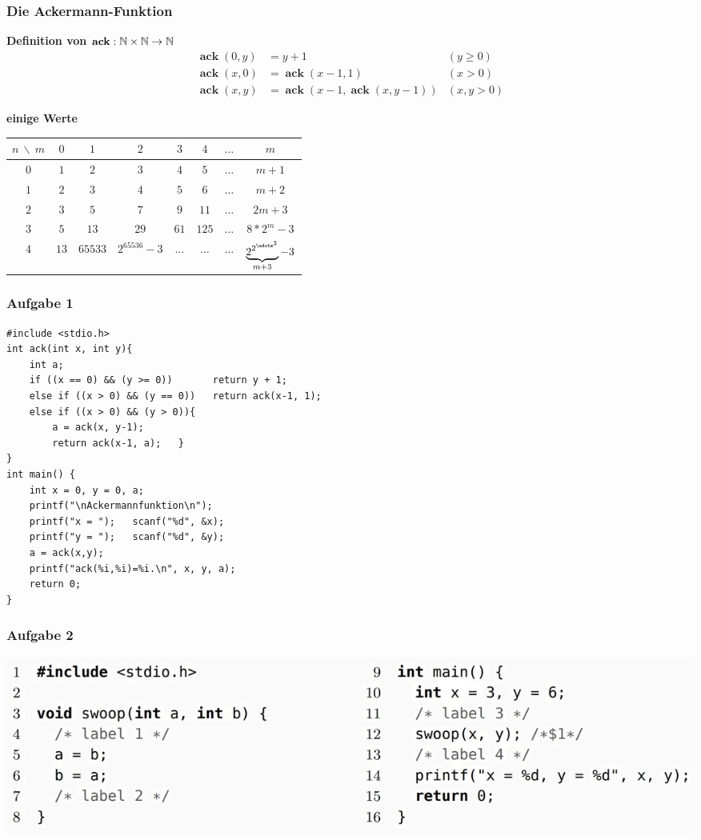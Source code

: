 \documentclass{beamer}
\DeclareMathOperator{\ack}{\mathbf{ack}}
\begin{document}
\begin{frame} \frametitle{Die Ackermann-Funktion}
\textbf{Definition von  $\ack : \N \times \N \to \N$}
	\begin{align*}
	\ack(0,y) &= y + 1 &(y \ge 0) \\
	\ack(x,0) &= \ack(x-1,1) &(x > 0)\\
	\ack(x,y) &= \ack(x-1,\ack(x,y-1)) &(x,y > 0)
	\end{align*}
	
	\textbf{einige Werte}
	
	\begin{small}
		\begin{tabular}{c||ccccccc}
			$n \ \backslash \ m$ & $0$ & $1$ & $2$ & $3$ & $4$ & $\dots$ & $m$ \\ \hline\hline
			$0$ & $1$ & $2$ & $3$ & $4$ & $5$ & $\dots$ & $m+1$ \\
			$1$ & $2$ & $3$ & $4$ & $5$ & $6$ & $\dots$ & $m+2$ \\
			$2$ & $3$ & $5$ & $7$ & $9$ & $11$ & $\dots$ & $2m+3$ \\
			$3$ & $5$ & $13$ & $29$ & $61$ & $125$ & $\dots$ & $8*2^m-3$ \\
			$4$ & $13$ & $65533$ & $2^{65536} -3$ & $\dots$ & $\dots$ & $\dots$ & $\underbrace{2^{2^{{\udots}^2}} }_{m+3}- 3$ 
		\end{tabular}
	\end{small}	
\end{frame}

\begin{frame}[fragile] \frametitle{Aufgabe 1}
	\footnotesize
\begin{lstlisting}
#include <stdio.h>
int ack(int x, int y){
	int a;
	if ((x == 0) && (y >= 0))       return y + 1;
	else if ((x > 0) && (y == 0))   return ack(x-1, 1);
	else if ((x > 0) && (y > 0)){
		a = ack(x, y-1);
		return ack(x-1, a);   }
}
int main() {
	int x = 0, y = 0, a;
	printf("\nAckermannfunktion\n");
	printf("x = ");   scanf("%d", &x);
	printf("y = ");   scanf("%d", &y);
	a = ack(x,y);
	printf("ack(%i,%i)=%i.\n", x, y, a);
	return 0;
}
\end{lstlisting}
\end{frame}

\begin{frame} \frametitle{Aufgabe 2}
	\centering
	\includegraphics[width=\textwidth]{./tut06_aufgabe2.jpg}
\end{frame}
\end{document}
